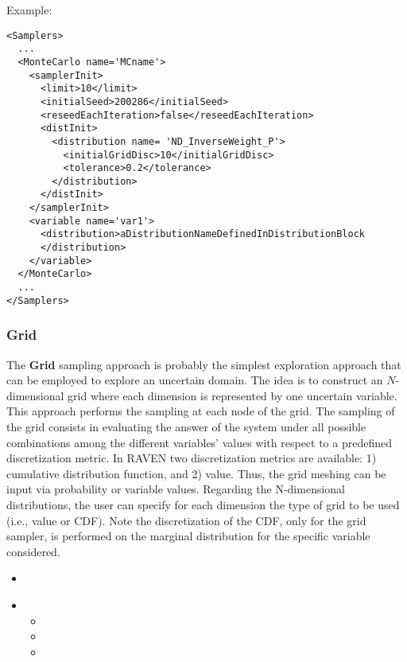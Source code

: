 
Example:
\begin{lstlisting}[style=XML]
<Samplers>
  ...
  <MonteCarlo name='MCname'>
    <samplerInit>
      <limit>10</limit>
      <initialSeed>200286</initialSeed>
      <reseedEachIteration>false</reseedEachIteration>
      <distInit>
        <distribution name= 'ND_InverseWeight_P'>
          <initialGridDisc>10</initialGridDisc>
          <tolerance>0.2</tolerance>
        </distribution>
      </distInit>
    </samplerInit>
    <variable name='var1'>
      <distribution>aDistributionNameDefinedInDistributionBlock
      </distribution>
    </variable>
  </MonteCarlo>
  ...
</Samplers>
\end{lstlisting}

\subsubsection{Grid}
\label{subsubsubsec:Grid}
The \textbf{Grid} sampling approach is probably the simplest exploration
approach that can be employed to explore an uncertain domain.
%
The idea is to construct an $N$-dimensional grid where each dimension is
represented by one uncertain variable.
%
This approach performs the sampling at each node of the grid.
%
The sampling of the grid consists in evaluating the answer of the system under
all possible combinations among the different variables' values with respect to
a predefined discretization metric.
%
In RAVEN two discretization metrics are available: 1) cumulative distribution
function, and 2) value.
%
Thus, the grid meshing can be input via probability or variable values.
%
Regarding the N-dimensional distributions, the user can specify for each dimension the type of grid to be used (i.e., value or CDF). Note the discretization of the CDF, only for the grid sampler, is performed on the marginal distribution for the specific variable considered.

%
\attrIntro
\begin{itemize}
\itemsep0em
\item \nameDescription
\end{itemize}
\begin{itemize}
\item \variableDescription
 \variableChildrenIntro
 \begin{itemize}
    \item \distributionDescription
    \item \functionDescription
    \item \gridDescription
  \end{itemize}
\end{itemize}

